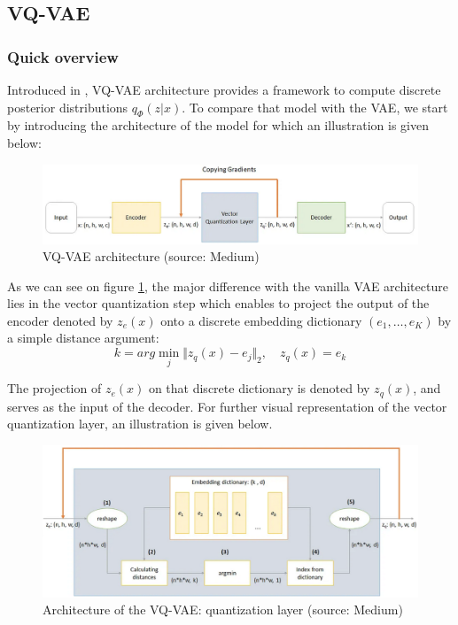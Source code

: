 \subsection{VQ-VAE}

\subsubsection{Quick overview}

Introduced in \cite{vq_vae_paper}, VQ-VAE architecture provides a framework to compute
discrete posterior distributions $q_{\Phi}(z|x)$.
To compare that model with the VAE, we start by introducing the architecture of the model for which an illustration is given below:

\begin{figure}[H]
    \centering
    \includegraphics[width=.9\textwidth]{images/vq_vae_architecture}
    \caption{VQ-VAE architecture (source: Medium)}
    \label{fig:vq_vae_architecture}
\end{figure}

As we can see on figure \ref{fig:vq_vae_architecture}, the major difference with the vanilla VAE architecture
lies in the vector quantization step which enables to project the output of the encoder denoted by $z_e(x)$
onto a discrete embedding dictionary $(e_1, \dots, e_K)$ by a simple distance argument:
$$
k = arg\min_{j} \Vert z_q(x) - e_j \Vert_2, \quad z_q(x) = e_k
$$

The projection of $z_e(x)$ on that discrete dictionary is denoted by $z_q(x)$, and serves as the input of the decoder.
For further visual representation of the vector quantization layer, an illustration is given below.

\begin{figure}[H]
    \centering
    \includegraphics[width=.7\textwidth]{images/vq_vae_quantization}
    \caption{Architecture of the VQ-VAE: quantization layer (source: Medium)}
    \label{fig:vq_vae_quantization}
\end{figure}

